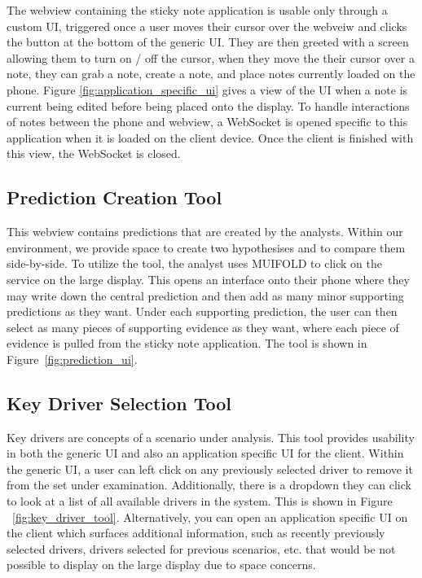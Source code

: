 The webview containing the sticky note application is usable only
through a custom UI, triggered once a user moves their cursor
over the webveiw and clicks the button at the bottom of the generic
UI. They are then greeted with a screen allowing them to turn on / off
the cursor, when they move the their cursor over a note, they can
grab a note, create a note, and place notes currently loaded on the
phone. Figure \ref{fig:application_specific_ui} gives a view of the
UI when a note is current being edited before being placed onto the
display. To handle interactions of notes between the phone and
webview, a WebSocket is opened specific to this application when
it is loaded on the client device. Once the client is finished with
this view, the WebSocket is closed.

\subsection{Prediction Creation Tool}

This webview contains predictions that are created by the analysts. Within our
environment, we provide space to create two hypothesises and to compare them
side-by-side. To utilize the tool, the analyst uses MUIFOLD to click on the
service on the large display. This opens an interface onto their phone where
they may write down the central prediction and then add as many minor supporting
predictions as they want. Under each supporting prediction, the user can then select
as many pieces of supporting evidence as they want, where each piece of evidence is
pulled from the sticky note application. The tool is shown in Figure~\ref{fig:prediction_ui}.

\subsection{Key Driver Selection Tool}

Key drivers are concepts of a scenario under analysis.
This tool provides usability in both the generic UI and also an
application specific UI for the client. Within the generic UI, a user
can left click on any previously selected driver to remove it
from the set under examination. Additionally, there is a dropdown
they can click to look at a list of all available drivers in the
system. This is shown in Figure ~\ref{fig:key_driver_tool}.
Alternatively, you can open an application specific UI on the client
which surfaces additional information, such as recently previously
selected drivers, drivers selected for previous scenarios, etc. that
would be not possible to display on the large display due to space
concerns.

